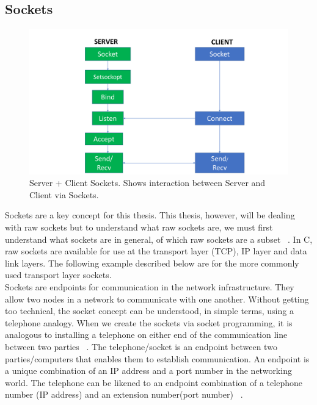 \subsection{Sockets}
\begin{figure}[h!]
    \centering
    \includegraphics[width=1.2\textwidth]{ServerClient.pdf}
    \caption{Server + Client Sockets. Shows interaction between Server and Client via Sockets.}
    \label{ServerClientModel}
\end{figure}

Sockets are a key concept for this thesis. This thesis, however, will be dealing with raw sockets but to understand what raw sockets are, we must first understand what sockets are in general, of which raw sockets are a subset ~\cite{38}. In C, raw sockets are available for use at the transport layer (TCP), IP layer and data link layers. The following example described below are for the more commonly used transport layer sockets. \\

Sockets are endpoints for communication in the network infrastructure. They allow two nodes in a network to communicate with one another. Without getting too technical, the socket concept can be understood, in simple terms, using a telephone analogy. When we create the sockets via socket programming, it is analogous to installing a telephone on either end of the communication line between two parties ~\cite{37}. The telephone/socket is an endpoint between two parties/computers that enables them to establish communication. An endpoint is a unique combination of an IP address and a port number in the networking world. The telephone can be likened to an endpoint combination of a telephone number (IP address) and an extension number(port number) ~\cite{37}. \\

